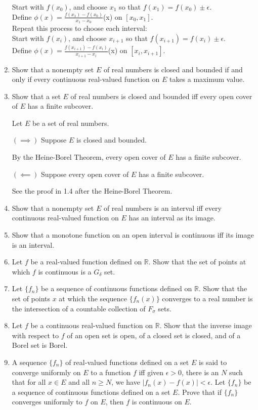 \begin{enumerate}
	Start with $f(x_0)$, and choose $x_1$ so that $f(x_1)=f(x_0)\pm \epsilon$.\\
	Define $\phi(x) = \frac{f(x_1)-f(x_0)}{x_1-x_0}$(x) on $[x_0,x_1]$.\\
	Repeat this process to choose each interval:\\
	Start with $f(x_i)$, and choose $x_{i+1}$ so that $f(x_{i+1})=f(x_i)\pm \epsilon$.\\
	Define $\phi(x) = \frac{f(x_{i+1})-f(x_i)}{x_{i+1}-x_i}$(x) on $[x_i,x_{i+1}]$.\\
	
	\item Show that a nonempty set $E$ of real numbers is closed and bounded if and only if every continuous real-valued function on $E$ takes a maximum value.
	\item Show that a set $E$ of real numbers is closed and bounded iff every open cover of $E$ has a finite subcover.\par
	Let $E$ be a set of real numbers.\par
	$(\implies)$ Suppose $E$ is closed and bounded.\par
	By the Heine-Borel Theorem, every open cover of $E$ has a finite subcover.
	\par
	$(\impliedby)$ Suppose every open cover of $E$ has a finite subcover.\par
	See the proof in 1.4 after the Heine-Borel Theorem.
	\item Show that a nonempty set $E$ of real numbers is an interval iff every continuous real-valued function on $E$ has an interval as its image.
	\item Show that a monotone function on an open interval is continuous iff its image is an interval. 
	\item Let $f$ be a real-valued function defined on $\mathbb{R}$. Show that the set of points at which $f$ is continuous is a $G_\delta$ set.
	\item Let $\{ f_n\}$ be a sequence of continuous functions defined on $\mathbb{R}$. Show that the set of points $x$ at which the sequence $\{f_n(x)\}$ converges to a real number is the intersection of a countable collection of $F_\sigma$ sets.
	\item Let $f$ be a continuous real-valued function on $\mathbb{R}$. Show that the inverse image with respect to $f$ of an open set is open, of a closed set is closed, and of a Borel set is Borel.
	\item A sequence $\{f_n\}$ of real-valued functions defined on a set $E$ is said to converge uniformly on $E$ to a function $f$ iff given $\epsilon >0$, there is an $N$ such that for all $x \in E$ and all $n \ge N$, we have $|f_n(x) - f(x)| < \epsilon$. Let $\{f_n\}$ be a sequence of continuous functions defined on a set $E$. Prove that if $\{f_n\}$ converges uniformly to $f$ on $E$, then $f$ is continuous on $E$. 
\end{enumerate}
